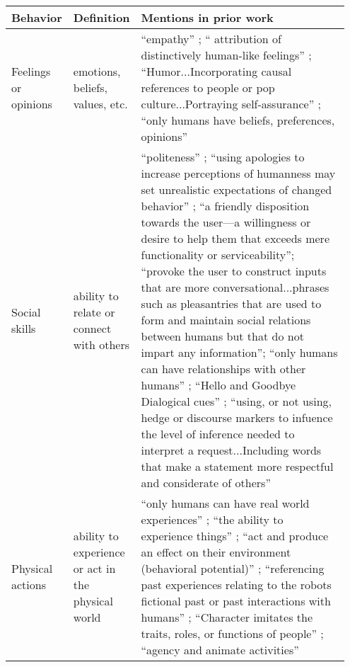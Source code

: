 \documentclass[11pt]{article}
\begin{document}
\begin{table*}[th!]
\scriptsize
\begin{tabular}{|p{0.1\linewidth}|p{0.1\linewidth}|p{0.75\linewidth}|}\hline
\textbf{Behavior} & \textbf{Definition}    & \textbf{Mentions in prior work}                                                                           \\\hline
Feelings or opinions       & emotions, beliefs, values, etc.                    & ``empathy'' \citep{abercrombie-etal-2023-mirages}; `` attribution of distinctively
human-like feelings'' \cite{cheng-etal-2024-anthroscore};  
``Humor...Incorporating causal references to people or pop culture...Portraying self-assurance'' \cite{Emnett2024-na}; ``only humans have beliefs, preferences, opinions'' \cite{Glaese2022-qo}                                                                   \\\hline
Social skills              & ability to relate or connect with others           & ``politeness'' \cite{Zamfirescu-Pereira2023-wp}; ``using apologies to increase perceptions of humanness may set unrealistic expectations of changed behavior'' \cite{De_Visser2016-dg};
``a friendly disposition towards the user—a willingness or desire to help them that exceeds mere functionality or serviceability''\cite{Maeda2024-cv}; ``provoke the user to construct inputs that are more conversational...phrases such as pleasantries that are used to form and maintain social relations between humans but that do not impart any information''\cite{abercrombie-etal-2023-mirages};
``only humans can have relationships with other humans'' \cite{Glaese2022-qo}; ``Hello and Goodbye Dialogical cues'' \cite{Araujo2018-ij}; ``using, or not using, hedge or discourse markers to infuence the level of inference needed to interpret a request...Including words that make a statement more respectful and considerate of others''\cite{Emnett2024-na}
\\\hline
Physical actions           & ability to experience or act in the physical world & ``only humans can have real world experiences'' \citep{Glaese2022-qo}; ``the ability to experience things'' \cite{Inie2024-dy}; ``act and
produce an effect on their environment (behavioral
potential)'' \cite{Epley2018-yp}; ``referencing past experiences relating to the robots fictional past or past interactions with humans'' \cite{Emnett2024-na}; ``Character imitates the traits, roles, or functions of people'' \cite{disalvo2005imitating}; ``agency and animate activities'' \cite{abercrombie-etal-2023-mirages}             \\\hline

\end{tabular}
\end{table*}
\end{document}

